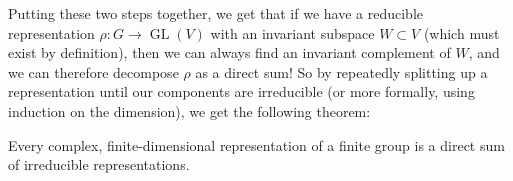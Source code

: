 Putting these two steps together, we get that if we have a reducible representation $\rho : G \to \operatorname{GL}(V)$ with an invariant subspace $W \subset V$ (which must exist by definition), then we can always find an invariant complement of $W$, and we can therefore decompose $\rho$ as a direct sum! So by repeatedly splitting up a representation until our components are irreducible (or more formally, using induction on the dimension), we get the following theorem:

\begin{theorem}
Every complex, finite-dimensional representation of a finite group is a direct sum of irreducible representations. 
\end{theorem}









